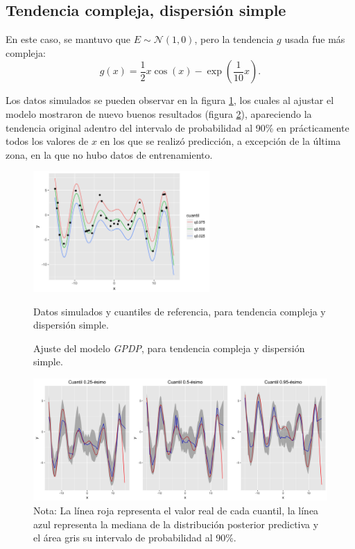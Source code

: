 \subsection{Tendencia compleja, dispersi\'on simple}

En este caso, se mantuvo que $E \sim \mathcal{N}(1,0)$, pero la tendencia $g$ usada fue m\'as compleja:
\begin{equation*}
    g(x) = \frac{1}{2} x \cos(x) - \exp\left(\frac{1}{10}x\right).
\end{equation*}

Los datos simulados se pueden observar en la figura \ref{sample_cgse}, los cuales al ajustar el modelo mostraron de nuevo buenos resultados (figura \ref{fitted_cgse}), apareciendo la tendencia original adentro del intervalo de probabilidad al 90\% en pr\'acticamente todos los valores de $x$ en los que se realiz\'o predicci\'on, a excepci\'on de la \'ultima zona, en la que no hubo datos de entrenamiento.

\begin{figure}[H]
	\centering
	\caption{Datos simulados y cuantiles de referencia, para tendencia compleja y dispersi\'on simple.}
	\includegraphics[width=0.60\textwidth]{Figures/Simulation/complex_g_simple_error/sample.png}
	\label{sample_cgse}
\end{figure}

\begin{figure}[H]
	\centering
	\caption{Ajuste del modelo \textit{GPDP}, para tendencia compleja y dispersi\'on simple.}
	\includegraphics[width=\textwidth]{Figures/Simulation/complex_g_simple_error/fitted_models.png}
	\captionsetup{singlelinecheck=off, font=footnotesize}
    \caption*{Nota: La l\'inea roja representa el valor real de cada cuantil, la l\'inea azul representa la mediana de la distribuci\'on posterior predictiva y el \'area gris su intervalo de probabilidad al 90\%.}
	\label{fitted_cgse}
\end{figure}

